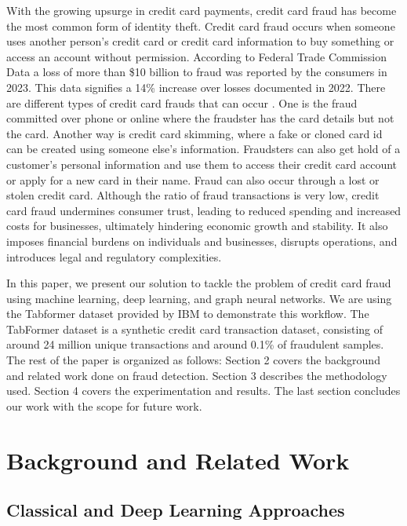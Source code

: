 \documentclass[pdflatex,sn-mathphys-num]{sn-jnl}%
\begin{document}
With the growing upsurge in credit card payments, credit card fraud has become the most common form of identity theft. Credit card fraud occurs when someone uses another person’s credit card or credit card information to buy something or access an account without permission.  According to Federal Trade Commission Data \cite{ftc2024} a loss of more than \$10 billion to fraud was reported by the consumers in 2023. This data signifies a 14\% increase over losses documented in 2022. There are different types of credit card frauds that can occur \cite{capitalone2024}. One is the fraud committed over phone or online where the fraudster has the card details but not the card. Another way is credit card skimming, where a fake or cloned card id can be created using someone else’s information. Fraudsters can also get hold of a customer’s personal information and use them to access their credit card account or apply for a new card in their name. Fraud can also occur through a lost or stolen credit card. Although the ratio of fraud transactions is very low, credit card fraud undermines consumer trust, leading to reduced spending and increased costs for businesses, ultimately hindering economic growth and stability. It also imposes financial burdens on individuals and businesses, disrupts operations, and introduces legal and regulatory complexities.

In this paper, we present our solution to tackle the problem of credit card fraud using machine learning, deep learning, and graph neural networks. We are using the Tabformer dataset provided by IBM \cite{ibm2021} to demonstrate this workflow. The TabFormer dataset is a synthetic credit card transaction dataset, consisting of around 24 million unique transactions and around 0.1\% of fraudulent samples. The rest of the paper is organized as follows: Section 2 covers the background and related work done on fraud detection. Section 3 describes the methodology used. Section 4 covers the experimentation and results. The last section concludes our work with the scope for future work.

\section{Background and Related Work}\label{sec2}

\subsection{Classical and Deep Learning Approaches}\label{subsec2}
\end{document}
